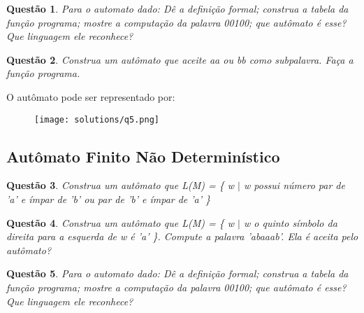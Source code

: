\documentclass{article}
\newtheorem{problem}{Questão}
\begin{document}
    \begin{problem}
        Para o automato dado: Dê a definição formal; construa a tabela da função programa; mostre a computação da palavra 00100; que autômato é esse? Que linguagem ele reconhece?
        
        
    \end{problem}
    \begin{solution}
        
    \end{solution}
    \begin{problem}
        Construa um autômato que aceite aa ou bb como subpalavra. Faça a função programa.
    \end{problem}
    
    \begin{solution} O autômato pode ser representado por:
           \begin{figure}[H]
           \centering
           \texttt{[image: solutions/q5.png]}
    \end{figure}
    \end{solution}

    \subsection{Autômato Finito Não Determinístico} 
    
    \begin{problem}
        Construa um autômato que L(M) = \{ w $\mid$ w 
        possui número par de 'a' e ímpar de 'b' ou par de 'b'
        e ímpar de 'a' \}
        
    \end{problem}
    \begin{solution}
        
    \end{solution}
    \begin{problem}
        Construa um autômato que L(M) = \{ w $\mid$ w 
        o quinto símbolo da direita para a esquerda de w é 'a' \}.
        Compute a palavra 'abaaab'. Ela é aceita pelo autômato?
    \end{problem}
    \begin{solution}
        
    \end{solution}
    \begin{problem}
        Para o automato dado: Dê a definição formal; construa a tabela da função programa; mostre a computação da palavra 00100; que autômato é esse? Que linguagem ele reconhece?
        
        
    \end{problem}
    
\end{document}

